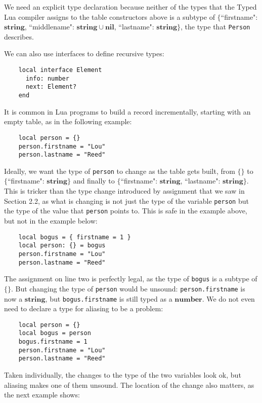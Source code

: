 \documentclass[preprint]{sig-alternate}
\newcommand{\Nil}{\mathbf{nil}}
\newcommand{\Number}{\mathbf{number}}
\newcommand{\String}{\mathbf{string}}
\begin{document}
We need an explicit type declaration because neither of
the types that the Typed Lua compiler assigns to the
table constructors above is a subtype of $\{$``firstname":
$\String$, ``middlename": $\String \cup \Nil$, ``lastname":
$\String\}$, the type that {\tt Person} describes.

We can also use interfaces to define recursive types:

\begin{verbatim}
    local interface Element
      info: number
      next: Element?
    end
\end{verbatim}

It is common in Lua programs to build a record incrementally,
starting with an empty table, as in the following example:

\begin{verbatim}
    local person = {}
    person.firstname = "Lou"
    person.lastname = "Reed"
\end{verbatim}

Ideally, we want the type of {\tt person} to change as the
table gets built, from $\{\}$ to $\{$``firstname": $\String\}$
and finally to $\{$``firstname": $\String$, ``lastname":
 $\String\}$. This is tricker than the type change introduced
by assignment that we saw in Section 2.2, as what is changing
is not just the type of the variable {\tt person} but the
type of the value that {\tt person} points to. This is safe
in the example above, but not in the example below:

\begin{verbatim}
    local bogus = { firstname = 1 }
    local person: {} = bogus
    person.firstname = "Lou"
    person.lastname = "Reed"
\end{verbatim}

The assignment on line two is perfectly legal, as the type
of {\tt bogus} is a subtype of $\{\}$. But changing the type
of {\tt person} would be unsound: {\tt person.firstname} is
now a $\String$, but {\tt bogus.firstname} is still typed
as a $\Number$. We do not even need to declare a type for
aliasing to be a problem: 

\begin{verbatim}
    local person = {}
    local bogus = person
    bogus.firstname = 1
    person.firstname = "Lou"
    person.lastname = "Reed"
\end{verbatim}

Taken individually, the changes to the type of the two
variables look ok, but aliasing makes one of them unsound.
The location of the change also matters, as the next example
shows:
\end{document}
